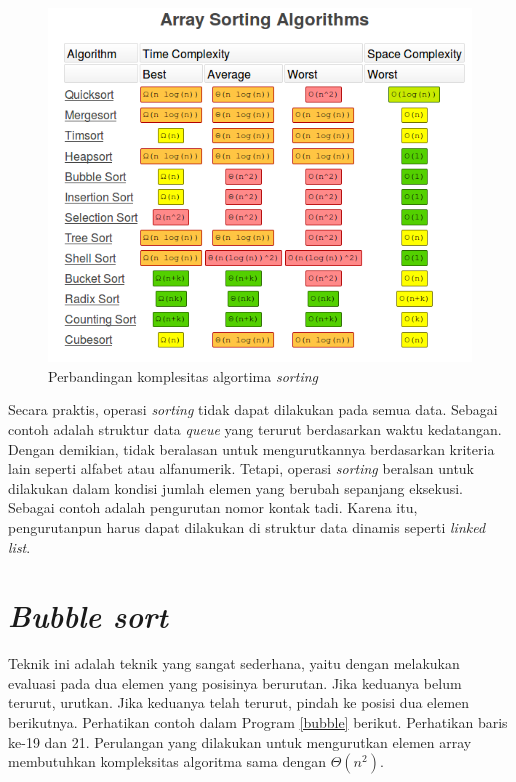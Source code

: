 \begin{figure}[H]
\centering
\includegraphics[scale=.5]{pics/ArraySorting.png}
\caption{Perbandingan komplesitas algortima \textit{sorting}}
\label{fig:sortingcomplex}
\end{figure}

Secara praktis, operasi \textit{sorting} tidak dapat dilakukan pada semua data. Sebagai contoh adalah struktur data \textit{queue} yang terurut berdasarkan waktu kedatangan. Dengan demikian, tidak beralasan untuk mengurutkannya berdasarkan kriteria lain seperti alfabet atau alfanumerik. Tetapi, operasi \textit{sorting} beralsan untuk dilakukan dalam kondisi jumlah elemen yang berubah sepanjang eksekusi. Sebagai contoh adalah pengurutan nomor kontak tadi. Karena itu, pengurutanpun harus dapat dilakukan di struktur data dinamis seperti \textit{linked list}. 

\section{\textit{Bubble sort}}
Teknik ini adalah teknik yang sangat sederhana, yaitu dengan melakukan evaluasi pada dua elemen yang posisinya berurutan. Jika keduanya belum terurut, urutkan. Jika keduanya telah terurut, pindah ke posisi dua elemen berikutnya. Perhatikan contoh dalam Program \ref{bubble} berikut. Perhatikan baris ke-19 dan 21. Perulangan yang dilakukan untuk mengurutkan elemen array membutuhkan kompleksitas algoritma sama dengan $\Theta(n^2)$.

